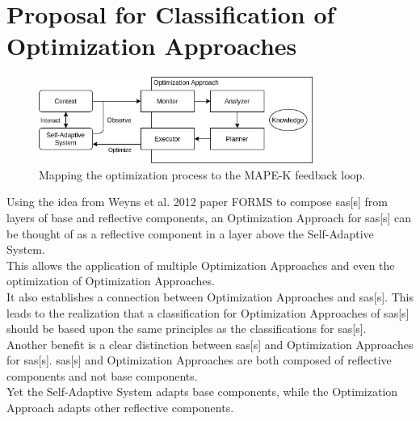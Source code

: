 \section{Proposal for Classification of Optimization Approaches}
\label{ch:Proposal}


\begin{figure}[t]
    \centering
    \includegraphics[width=0.8\textwidth]{images/ClassificationProposal-OptimizationMAPEK_horizontal.png}
    \caption{Mapping the optimization process to the MAPE-K feedback loop.}
    \label{fig:MappingOptMAPEK}
\end{figure}

Using the idea from Weyns et al. 2012 paper FORMS \cite*{FORMS} to compose \acrlong{sas}[s] from
layers of base and reflective components, 
an Optimization Approach for \acrlong{sas}[s] can be thought of
as a reflective component in a layer above the Self-Adaptive System. \\
This allows the application of multiple Optimization Approaches and even the 
optimization of Optimization Approaches. \\
It also establishes a connection between Optimization Approaches and \acrlong{sas}[s].
This leads to the realization that a classification for Optimization Approaches of \acrlong{sas}[s]
should be based upon the same principles as the classifications for \acrlong{sas}[s]. \\
Another benefit is a clear distinction between \acrlong{sas}[s] and Optimization Approaches for \acrlong{sas}[s].
\acrlong{sas}[s] and Optimization Approaches are both composed of reflective components and not base components. \\
Yet the Self-Adaptive System adapts base components, while the Optimization Approach adapts other reflective components.

